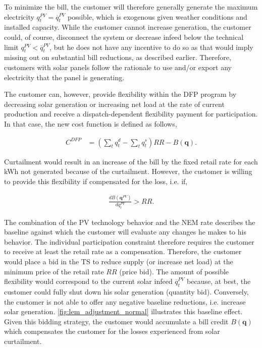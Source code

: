 To minimize the bill, the customer will therefore generally generate the maximum electricity $q^{PV}_t = \overline{q}^{PV}_t$ possible, which is exogenous given weather conditions and installed capacity.
While the customer cannot increase generation, the customer could, of course, disconnect the system or decrease infeed below the technical limit $q^{PV}_t < \overline{q}^{PV}_t$, but he does not have any incentive to do so as that would imply missing out on substantial bill reductions, as described earlier. 
Therefore, customers with solar panels follow the rationale to use and/or export any electricity that the panel is generating.

The customer can, however, provide flexibility within the DFP program by decreasing solar generation or increasing net load at the rate of current production and receive a dispatch-dependent flexibility payment for participation. In that case, the new cost function is defined as follows,

\begin{align}
    C^{DFP} &= (\sum_t q^d_t - \sum_t q^s_t) RR - B(\mathbf{q}).
\end{align}

Curtailment would result in an increase of the bill by the fixed retail rate for each kWh not generated because of the curtailment. However, the customer is willing to provide this flexibility if compensated for the loss, i.e. if,

\begin{align}
    \frac{d B(\mathbf{q}^{PV})}{d q^{PV}_t} > RR .
\end{align}

The combination of the PV technology behavior and the NEM rate describes the baseline against which the customer will evaluate any changes he makes to his behavior.
The individual participation constraint therefore requires the customer to receive at least the retail rate as a compensation. Therefore, the customer would place a bid in the TS to reduce supply (or increase net load) at the minimum price of the retail rate $RR$  (price bid).
The amount of possible flexibility would correspond to the current solar infeed $\overline{q}^{PV}_t$ because, at best, the customer could fully shut down his solar generation (quantity bid). Conversely, the customer is not able to offer any negative baseline reductions, i.e. increase solar generation. \cref{fig:lem_adjustment_normal} illustrates this baseline effect.
Given this bidding strategy, the customer would accumulate a bill credit $B(\mathbf{q})$ which compensates the customer for the losses experienced from solar curtailment.


